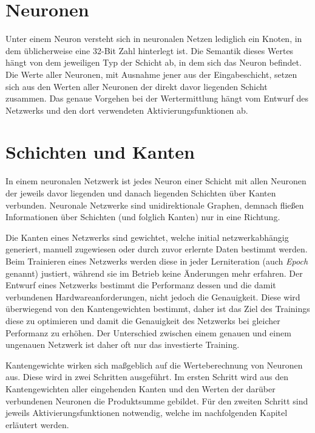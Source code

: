 \section{Neuronen}\label{sec:neurons}

Unter einem Neuron versteht sich in neuronalen Netzen lediglich ein Knoten,
in dem üblicherweise eine 32-Bit Zahl hinterlegt ist. Die Semantik
dieses Wertes hängt von dem jeweiligen Typ der Schicht ab, in dem sich das
Neuron befindet.
Die Werte aller Neuronen, mit Ausnahme jener aus der Eingabeschicht, setzen sich
aus den Werten aller Neuronen der direkt davor liegenden Schicht zusammen.
Das genaue Vorgehen bei der Wertermittlung hängt vom Entwurf des Netzwerks
und den dort verwendeten Aktivierungsfunktionen ab.

\section{Schichten und Kanten}\label{sec:layers}

In einem neuronalen Netzwerk ist jedes Neuron einer Schicht mit allen Neuronen
der jeweils davor liegenden und danach liegenden Schichten über Kanten verbunden.
Neuronale Netzwerke sind unidirektionale Graphen, demnach fließen Informationen
über Schichten (und folglich Kanten) nur in eine Richtung.

Die Kanten eines Netzwerks sind gewichtet, welche initial netzwerkabhängig
generiert, manuell zugewiesen oder durch zuvor erlernte Daten bestimmt werden.
Beim Trainieren eines Netzwerks werden diese in jeder Lerniteration
(auch \emph{Epoch} genannt) justiert, während sie im Betrieb keine Änderungen
mehr erfahren.
Der Entwurf eines Netzwerks bestimmt die Performanz dessen und die damit
verbundenen Hardwareanforderungen, nicht jedoch die Genauigkeit.
Diese wird überwiegend von den Kantengewichten bestimmt, daher ist das Ziel
des Trainings diese zu optimieren und damit die Genauigkeit des Netzwerks bei
gleicher Performanz zu erhöhen. Der Unterschied zwischen einem genauen und
einem ungenauen Netzwerk ist daher oft nur das investierte Training.

Kantengewichte wirken sich maßgeblich auf die Werteberechnung von Neuronen aus.
Diese wird in zwei Schritten ausgeführt. Im ersten Schritt wird aus den
Kantengewichten aller eingehenden Kanten und den Werten der darüber
verbundenen Neuronen die Produktsumme gebildet.
Für den zweiten Schritt sind jeweils Aktivierungsfunktionen notwendig, welche
im nachfolgenden Kapitel erläutert werden.

